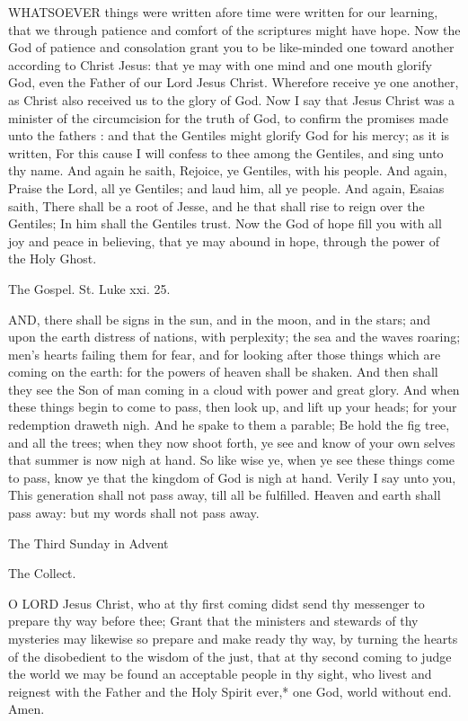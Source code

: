WHATSOEVER things were written afore time were written for our learning, that we through patience and comfort of the scriptures might have hope. Now the God of patience and consolation grant you to be like-minded one toward another according to Christ Jesus: that ye may with one mind and one mouth glorify God, even the Father of our Lord Jesus Christ. Wherefore receive ye one another, as Christ also received us to the glory of God. Now I say that Jesus Christ was a minister of the circumcision for the truth of God, to confirm the promises made unto the fathers : and that the Gentiles might glorify God for his mercy; as it is written, For this cause I will confess to thee among the Gentiles, and sing unto thy name. And again he saith, Rejoice, ye Gentiles, with his people. And again, Praise the Lord, all ye Gentiles; and laud him, all ye people. And again, Esaias saith, There shall be a root of Jesse, and he that shall rise to reign over the Gentiles; In him shall the Gentiles trust. Now the God of hope fill you with all joy and peace in believing, that ye may abound in hope, through the power of the Holy Ghost.   
 

The Gospel. St. Luke xxi. 25.

AND, there shall be signs in the sun, and in the moon, and in the stars; and upon the earth distress of nations, with perplexity; the sea and the waves roaring; men's hearts failing them for fear, and for looking after those things which are coming on the earth: for the powers of heaven shall be shaken. And then shall they see the Son of man coming in a cloud with power and great glory. And when these things begin to come to pass, then look up, and lift up your heads; for your redemption draweth nigh. And he spake to them a parable; Be hold the fig tree, and all the trees; when they now shoot forth, ye see and know of your own selves that summer is now nigh at hand. So like wise ye, when ye see these things come to pass, know ye that the kingdom of God is nigh at hand. Verily I say unto you, This generation shall not pass away, till all be fulfilled. Heaven and earth shall pass away: but my words shall not pass away.

 
The Third Sunday in Advent


The Collect.

O LORD Jesus Christ, who at thy first coming didst send thy messenger to prepare thy way before thee; Grant that the ministers and stewards of thy mysteries may likewise so prepare and make ready thy way, by turning the hearts of the disobedient to the wisdom of the just, that at thy second coming to judge the world we may be found an acceptable people in thy sight, who livest and reignest with the Father and the Holy Spirit ever,* one God, world without end. Amen.

